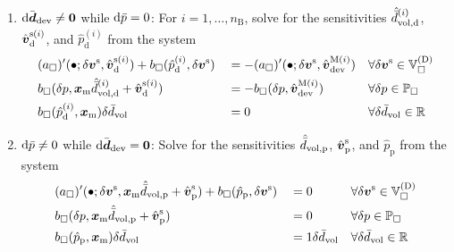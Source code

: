\documentclass[10pt,a4paper]{article}
\newcommand{\ded}{\mathrm{d}}
\newcommand{\dep}{\mathrm{p}}
\begin{document}
\begin{enumerate}
\item $\operatorname{d \!}\bar{\boldsymbol{d}}_{\mathrm{dev}}\neq \boldsymbol{0}$ while $\operatorname{d \!}\bar{p}=0$: For $i=1,\ldots,n_{\mathrm{B}}$, solve for the sensitivities $\hat{\bar{d}}^{(i)}_{\vol,\ded}$, $\hat{\ta{v}}^{\fluct(i)}_\ded$, and $\hat{p}^{(i)}_\ded$ from the system
\begin{align}
    \label{eq233a} &
    (a_\Box)'(\bullet;\delta\ta{v}^\fluct,\hat{\ta{v}}^{\fluct(i)}_\ded) +
    b_\Box(\hat{p}^{(i)}_\ded,\delta\ta{v}^\fluct)
    && =
    - (a_\Box)'(\bullet;\delta\ta{v}^\fluct,\hat{\ta{v}}^{\macro(i)}_\dev)
    && \forall \delta \ta{v}^\fluct\in\set{V}_\Box^{(\Dirichlet)}
 \\
    \label{eq233b} &
    b_\Box(\delta p, \ta x_\mean \hat{\bar{d}}_{\vol,\ded}^{(i)} + \hat{\ta{v}}^{\fluct(i)}_\ded)
    && =
    - b_\Box(\delta p,\hat{\ta{v}}^{\macro(i)}_\dev)
    && \forall \delta p\in\set{P}_\Box
\\
    \label{eq233c} &
    b_\Box(\hat{p}^{(i)}_\ded,\ta{x}_\mean)\delta\bar{d}_\vol
    && =
    0
    && \forall \delta\bar{d}_\vol  \in \set{R}
\end{align}

\item $\operatorname{d \!}\bar{p}\neq 0$ while $\operatorname{d \!}\bar{\boldsymbol{d}}_{\mathrm{dev}}=\boldsymbol{0}$: Solve for the sensitivities $\hat{\bar{d}}_{\vol,\dep}$, $\hat{\ta{v}}^{\fluct}_\dep$, and $\hat{p}_\dep$ from the system
\begin{align}
    \label{eq243a} &
    (a_\Box)'(\bullet;\delta\ta{v}^\fluct,\ta x_\mean \hat{\bar{d}}_{\vol,\dep}+\hat{\ta{v}}^{\fluct}_\dep) +
    b_\Box(\hat{p}_\dep,\delta\ta{v}^\fluct)
    && =
    0
    && \forall \delta \ta{v}^\fluct\in\set{V}_\Box^{(\Dirichlet)}
 \\
    \label{eq243b} &
    b_\Box(\delta p,\ta x_\mean \hat{\bar{d}}_{\vol,\dep}+\hat{\ta{v}}^{\fluct}_\dep)
    && =
    0
    && \forall \delta p\in\set{P}_\Box
\\
    \label{eq243c} &
    b_\Box(\hat{p}_\dep,\ta{x}_\mean)\delta\bar{d}_\vol
    && =
    1\delta\bar{d}_\vol
    && \forall \delta\bar{d}_\vol  \in \set{R}
\end{align}
\end{enumerate}
\end{document}
